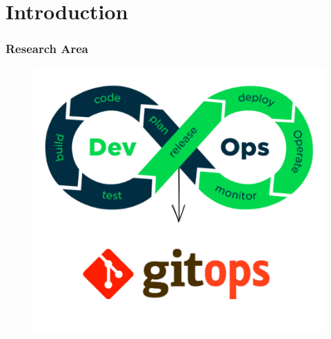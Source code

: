 \documentclass{beamer}
\title{\yourThesisTitle}
\subtitle{\typeOfWork}
\author{\yourNameInclTitle}
\begin{document}

\maketitle


\section{Introduction}

\begin{frame}
\frametitle{Research Area}
    
\begin{figure}[h]
	\centering
	\includegraphics[width=0.60\linewidth]{assets/devops-gitops.png}
	\label{fig:devopsGitOps}	
\end{figure}




\end{frame}
\end{document}
